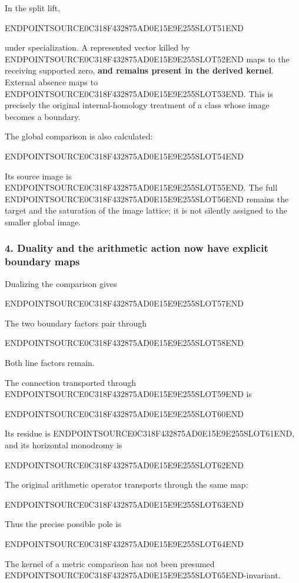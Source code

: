 In the split lift,

ENDPOINTSOURCE0C318F432875AD0E15E9E255SLOT51END

under specialization. A represented vector killed by ENDPOINTSOURCE0C318F432875AD0E15E9E255SLOT52END maps to the receiving supported zero, \textbf{and remains present in the derived kernel}. External absence maps to ENDPOINTSOURCE0C318F432875AD0E15E9E255SLOT53END. This is precisely the original internal-homology treatment of a class whose image becomes a boundary.

The global comparison is also calculated:

ENDPOINTSOURCE0C318F432875AD0E15E9E255SLOT54END

Its source image is ENDPOINTSOURCE0C318F432875AD0E15E9E255SLOT55END. The full ENDPOINTSOURCE0C318F432875AD0E15E9E255SLOT56END remains the target and the saturation of the image lattice; it is not silently assigned to the smaller global image.

\subsubsection{4. Duality and the arithmetic action now have explicit boundary maps}\label{endpoint-curvature_original--duality-and-the-arithmetic-action-now-have-explicit-boundary-maps}

Dualizing the comparison gives

ENDPOINTSOURCE0C318F432875AD0E15E9E255SLOT57END

The two boundary factors pair through

ENDPOINTSOURCE0C318F432875AD0E15E9E255SLOT58END

Both line factors remain.

The connection transported through ENDPOINTSOURCE0C318F432875AD0E15E9E255SLOT59END is

ENDPOINTSOURCE0C318F432875AD0E15E9E255SLOT60END

Its residue is ENDPOINTSOURCE0C318F432875AD0E15E9E255SLOT61END, and its horizontal monodromy is

ENDPOINTSOURCE0C318F432875AD0E15E9E255SLOT62END

The original arithmetic operator transports through the same map:

ENDPOINTSOURCE0C318F432875AD0E15E9E255SLOT63END

Thus the precise possible pole is

ENDPOINTSOURCE0C318F432875AD0E15E9E255SLOT64END

The kernel of a metric comparison has not been presumed ENDPOINTSOURCE0C318F432875AD0E15E9E255SLOT65END-invariant.

